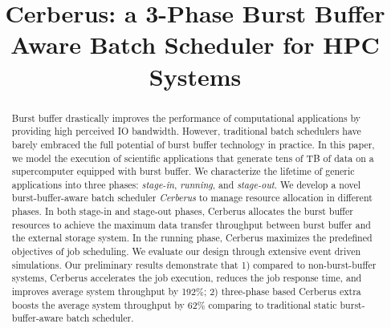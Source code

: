 \documentclass[10pt, conference,compsoc]{IEEEtran}
\begin{document}
%
\title{Cerberus: a 3-Phase Burst Buffer Aware Batch Scheduler for HPC Systems}


\author{
\and
{}
}




\maketitle

\begin{abstract}
Burst buffer drastically improves the performance of computational applications by providing high perceived IO bandwidth.
However, traditional batch schedulers have barely embraced the full potential of burst buffer technology in practice. 
In this paper, we model the execution of scientific applications
that generate tens of TB of data on a supercomputer equipped with burst buffer.
We characterize the lifetime of generic applications into three phases:
\textit{stage-in}, \textit{running}, and \textit{stage-out}.
We develop a novel burst-buffer-aware batch scheduler \textit{Cerberus} to 
manage resource allocation in different phases.
In both stage-in and stage-out phases, Cerberus
allocates the burst buffer resources to achieve the maximum data transfer throughput
between burst buffer and the external storage system.
In the running phase, Cerberus maximizes the predefined objectives of job scheduling.
We evaluate our design through extensive event driven simulations. 
Our preliminary results demonstrate that
1) compared to non-burst-buffer systems, Cerberus accelerates the job execution, reduces the job response time, and improves average system throughput by 192\%;
2) three-phase based Cerberus extra boosts the average system throughput by 62\% comparing to traditional static burst-buffer-aware batch scheduler.
\end{abstract}
\end{document}
